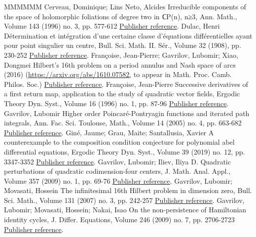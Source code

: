 \documentclass[11pt]{article}
\theoremstyle{definition}
\numberwithin{equation}{section}
\numberwithin{figure}{section}
\numberwithin{table}{section}
\begin{document}
\begin{thebibliography}{MMMMMM}
 Cerveau, Dominique; Lins Neto, Alcides Irreducible components of the space of holomorphic foliations of degree two in ℂP(n), n≥3, Ann. Math., Volume 143 (1996) no. 3, pp. 577-612 \href{https://ahl.centre-mersenne.org/item/AHL_2020__3__615_0/#cerlin96}{Publisher reference}.
 Dulac, Henri Détermination et intégration d’une certaine classe d’équations différentielles ayant pour point singulier un centre, Bull. Sci. Math. II. Sér., Volume 32 (1908), pp. 230-252 \href{https://ahl.centre-mersenne.org/item/AHL_2020__3__615_0/#dul08}{Publisher reference}.
 Françoise, Jean-Pierre; Gavrilov, Lubomir; Xiao, Dongmei Hilbert’s 16th problem on a period annulus and Nash space of arcs (2016) (\url{https://arxiv.org/abs/1610.07582,} to appear in Math. Proc. Camb. Philos. Soc.) \href{https://ahl.centre-mersenne.org/item/AHL_2020__3__615_0/#gavr16}{Publisher reference}.
 Françoise, Jean-Pierre Successive derivatives of a first return map, application to the study of quadratic vector fields, Ergodic Theory Dyn. Syst., Volume 16 (1996) no. 1, pp. 87-96 \href{https://ahl.centre-mersenne.org/item/AHL_2020__3__615_0/#fran96}{Publisher reference}.
 Gavrilov, Lubomir Higher order Poincaré-Pontryagin functions and iterated path integrals, Ann. Fac. Sci. Toulouse, Math., Volume 14 (2005) no. 4, pp. 663-682 \href{https://ahl.centre-mersenne.org/item/AHL_2020__3__615_0/#gavr05}{Publisher reference}.
 Giné, Jaume; Grau, Maite; Santallusia, Xavier A counterexample to the composition condition conjecture for polynomial abel differential equations, Ergodic Theory Dyn. Syst., Volume 39 (2019) no. 12, pp. 3347-3352 \href{https://ahl.centre-mersenne.org/item/AHL_2020__3__615_0/#ggs18}{Publisher reference}.
 Gavrilov, Lubomir; Iliev, Iliya D. Quadratic perturbations of quadratic codimension-four centers, J. Math. Anal. Appl., Volume 357 (2009) no. 1, pp. 69-76 \href{https://ahl.centre-mersenne.org/item/AHL_2020__3__615_0/#gail09}{Publisher reference}.
 Gavrilov, Lubomir; Movasati, Hossein The infinitesimal 16th Hilbert problem in dimension zero, Bull. Sci. Math., Volume 131 (2007) no. 3, pp. 242-257 \href{https://ahl.centre-mersenne.org/item/AHL_2020__3__615_0/#gamo07}{Publisher reference}.
 Gavrilov, Lubomir; Movasati, Hossein; Nakai, Isao On the non-persistence of Hamiltonian identity cycles, J. Differ. Equations, Volume 246 (2009) no. 7, pp. 2706-2723 \href{https://ahl.centre-mersenne.org/item/AHL_2020__3__615_0/#gmn09}{Publisher reference}.

\end{thebibliography}
\end{document}
